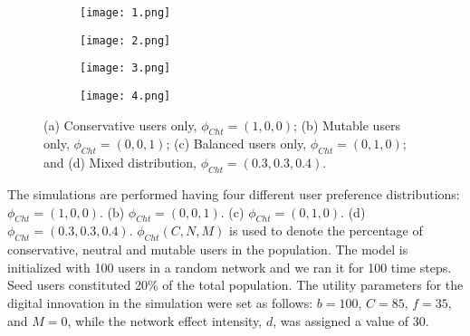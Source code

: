 \documentclass{article} %
\begin{document}
\begin{figure}[h]
    \centering
    \begin{subfigure}{0.3\textwidth}
        \centering
        \texttt{[image: 1.png]} %
        \caption{}
        \label{fig:subfig_a}
    \end{subfigure}
    \hspace{0.05\textwidth} %
    \begin{subfigure}{0.3\textwidth}
        \centering
        \texttt{[image: 2.png]} %
        \caption{}
        \label{fig:subfig_b}
    \end{subfigure}
    
    \vspace{0.5cm} %
    \begin{subfigure}{0.3\textwidth}
        \centering
        \texttt{[image: 3.png]} %
        \caption{}
        \label{fig:subfig_c}
    \end{subfigure}
    \hspace{0.05\textwidth} %
    \begin{subfigure}{0.3\textwidth}
        \centering
        \texttt{[image: 4.png]} %
        \caption{}
        \label{fig:subfig_d}
    \end{subfigure}
    
    \caption{(a) Conservative users only, \( \phi_{Cht} = (1, 0, 0) \); (b) Mutable users only, \( \phi_{Cht} = (0, 0, 1) \); (c) Balanced users only, \( \phi_{Cht} = (0, 1, 0) \); and (d) Mixed distribution, \( \phi_{Cht} = (0.3, 0.3, 0.4) \).}
    \label{fig:diffusion_dynamics}
\end{figure}
The simulations are performed having four different user preference distributions: \( \phi_{Cht} = (1, 0, 0) \). (b) \( \phi_{Cht} = (0, 0, 1) \). (c) \( \phi_{Cht} = (0, 1, 0) \). (d) \( \phi_{Cht} = (0.3, 0.3, 0.4) \). \( \phi_{Cht}(C,N,M)\) is used to denote the percentage of conservative, neutral and mutable users in the population. The model is initialized with 100 users in a random network and we ran it for 100 time steps. Seed users constituted 20\% of the total population. The utility parameters for the digital innovation in the simulation were set as follows: \( b = 100 \), \( C = 85 \), \( f = 35 \), and \( M = 0 \), while the network effect intensity, \( d \), was assigned a value of 30. 
\end{document}
